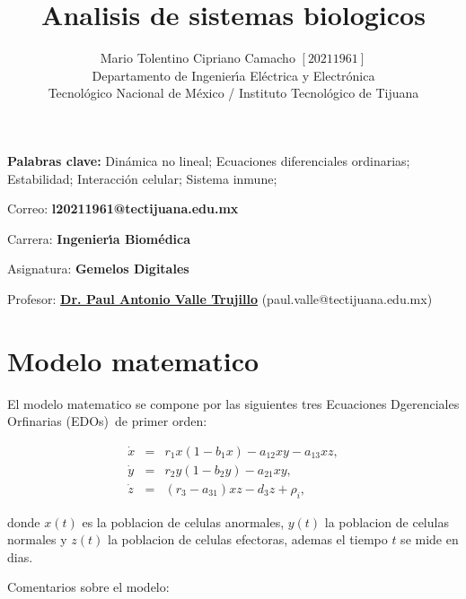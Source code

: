 \documentclass[letterpaper,11pt]{article}
\begin{document}
\title{Analisis de sistemas biologicos}
\author{Mario Tolentino Cipriano Camacho $\left[ 20211961\right] $ \\
Departamento de Ingenier\'{\i}a El\'{e}ctrica y Electr\'{o}nica\\
Tecnol\'{o}gico Nacional de M\'{e}xico / Instituto Tecnol\'{o}gico de Tijuana%
}
\maketitle

\noindent \textbf{Palabras clave: }Din\'{a}mica no lineal; Ecuaciones
diferenciales ordinarias; Estabilidad; Interacci\'{o}n celular; Sistema
inmune; 

\noindent Correo: \textbf{l20211961@tectijuana.edu.mx}

\noindent \noindent Carrera: \textbf{Ingenier\'{\i}a Biom\'{e}dica }

\noindent Asignatura: \textbf{Gemelos Digitales}

\noindent Profesor: \href{https://biomath.xyz/}{\textbf{Dr. Paul Antonio
Valle Trujillo}} (paul.valle@tectijuana.edu.mx)

\section{Modelo matematico}

\bigskip El modelo matematico se compone por las siguientes tres Ecuaciones
Dgerenciales Orfinarias (EDOs)\ de primer orden:

\begin{eqnarray}
\dot{x} &=&r_{1}x(1-b_{1}x)-a_{12}xy-a_{13}xz,  \label{dx} \\
\dot{y} &=&r_{2}y(1-b_{2}y)-a_{21}xy,  \label{dy} \\
\dot{z} &=&(r_{3}-a_{31})xz-d_{3}z+\rho _{i},  \label{dz}
\end{eqnarray}

donde $x(t)$ es la poblacion de celulas anormales, $y(t)$ la poblacion de
celulas normales y $z(t)$ la poblacion de celulas efectoras, ademas el
tiempo $t$ se mide en dias.

Comentarios sobre el modelo:
\end{document}

